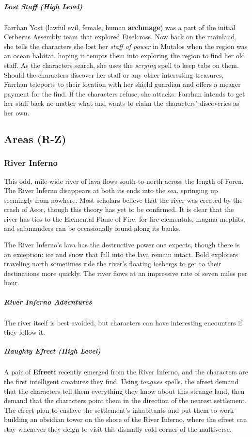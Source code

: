 \documentclass[10pt,a4paper,twoside,bg=print,twocolumn,openany,nodeprecatedcode]{dndbook}
\begin{document}
\subparagraph{Lost Staff (High Level)}
Farrhan Yost (lawful evil, female, human \textbf{archmage}) was a part of the initial Cerberus Assembly team that explored Eiselcross. Now back on the mainland, she tells the characters she lost her \textit{staff of power} in Mutalos when the region was an ocean habitat, hoping it tempts them into exploring the region to find her old staff. As the characters search, she uses the \textit{scrying} spell to keep tabs on them. Should the characters discover her staff or any other interesting treasures, Farrhan teleports to their location with her shield guardian and offers a meager payment for the find. If the characters refuse, she attacks. Farrhan intends to get her staff back no matter what and wants to claim the characters' discoveries as her own.

\subsection{Areas (R-Z)}
\subsubsection{River Inferno}
This odd, mile-wide river of lava flows south-to-north across the length of Foren. The River Inferno disappears at both its ends into the sea, springing up seemingly from nowhere. Most scholars believe that the river was created by the crash of Aeor, though this theory has yet to be confirmed. It is clear that the river has ties to the Elemental Plane of Fire, for fire elementals, magma mephits, and salamanders can be occasionally found along its banks.

The River Inferno's lava has the destructive power one expects, though there is an exception: ice and snow that fall into the lava remain intact. Bold explorers traveling north sometimes ride the river's floating icebergs to get to their destinations more quickly. The river flows at an impressive rate of seven miles per hour.

\subparagraph{River Inferno Adventures}
The river itself is best avoided, but characters can have interesting encounters if they follow it.

\subparagraph{Haughty Efreet (High Level)}
A pair of \textbf{Efreeti} recently emerged from the River Inferno, and the characters are the first intelligent creatures they find. Using \textit{tongues} spells, the efreet demand that the characters tell them everything they know about this strange land, then demand that the characters point them in the direction of the nearest settlement. The efreet plan to enslave the settlement's inhabitants and put them to work building an obsidian tower on the shore of the River Inferno, where the efreet can stay whenever they deign to visit this dismally cold corner of the multiverse.
\end{document}
